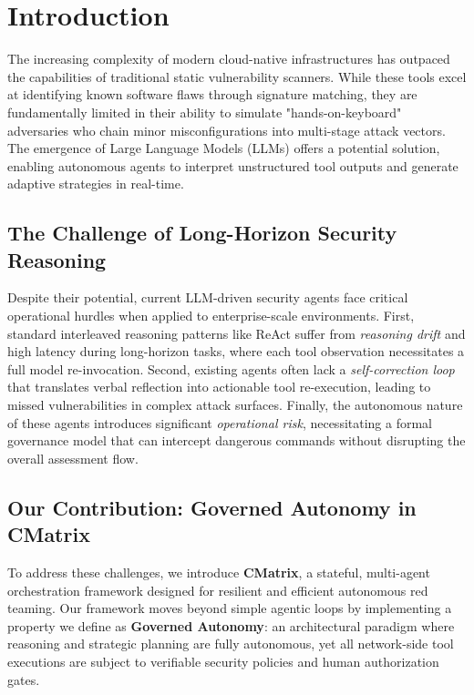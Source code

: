 \section{Introduction}

The increasing complexity of modern cloud-native infrastructures has outpaced the capabilities of traditional static vulnerability scanners. While these tools excel at identifying known software flaws through signature matching, they are fundamentally limited in their ability to simulate "hands-on-keyboard" adversaries who chain minor misconfigurations into multi-stage attack vectors. The emergence of Large Language Models (LLMs) offers a potential solution, enabling autonomous agents to interpret unstructured tool outputs and generate adaptive strategies in real-time.

\subsection{The Challenge of Long-Horizon Security Reasoning}
Despite their potential, current LLM-driven security agents face critical operational hurdles when applied to enterprise-scale environments. First, standard interleaved reasoning patterns like ReAct suffer from \textit{reasoning drift} and high latency during long-horizon tasks, where each tool observation necessitates a full model re-invocation. Second, existing agents often lack a \textit{self-correction loop} that translates verbal reflection into actionable tool re-execution, leading to missed vulnerabilities in complex attack surfaces. Finally, the autonomous nature of these agents introduces significant \textit{operational risk}, necessitating a formal governance model that can intercept dangerous commands without disrupting the overall assessment flow.

\subsection{Our Contribution: Governed Autonomy in CMatrix}
To address these challenges, we introduce \textbf{CMatrix}, a stateful, multi-agent orchestration framework designed for resilient and efficient autonomous red teaming. Our framework moves beyond simple agentic loops by implementing a property we define as \textbf{Governed Autonomy}: an architectural paradigm where reasoning and strategic planning are fully autonomous, yet all network-side tool executions are subject to verifiable security policies and human authorization gates. 

